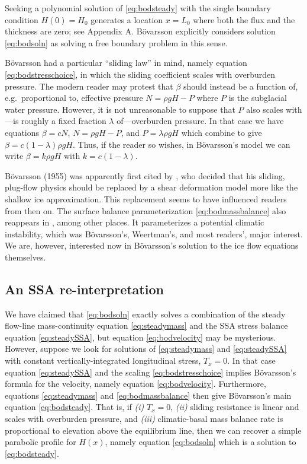 \documentclass[twocolumn,letterpaper]{igs}
\renewcommand{\dh}{\fontencoding{T1}\selectfont{\symbol{240}}}
\newcommand{\bod}{B\"o\dh varsson\xspace}
\newcommand{\citebod}{B\"o\dh varsson (1955)\nocite{Bodvardsson}\xspace}
\begin{document}
Seeking a polynomial solution of \eqref{eq:bodsteady} with the single boundary condition $H(0)=H_0$ generates a location $x=L_0$ where both the flux and the thickness are zero; see Appendix A.  \bod explicitly considers solution \eqref{eq:bodsoln} as solving a free boundary problem in this sense.

\bod had a particular ``sliding law'' in mind, namely equation \eqref{eq:bodstresschoice}, in which the sliding coefficient scales with overburden pressure.  The modern reader may protest that $\beta$ should instead be a function of, e.g.~proportional to, effective pressure $N=\rho g H - P$ where $P$ is the subglacial water pressure.  However, it is not unreasonable to suppose that $P$ also scales with---is roughly a fixed fraction $\lambda$ of---overburden pressure.  In that case we have equations $\beta = c N$, $N=\rho g H - P$, and $P = \lambda \rho g H$ which combine to give $\beta = c (1-\lambda) \rho g H$.  Thus, if the reader so wishes, in \bod's model we can write $\beta = k \rho g H$ with $k=c (1-\lambda)$.

\citebod was apparently first cited by \cite{Weertman61stability}, who decided that his sliding, plug-flow physics should be replaced by a shear deformation model more like the shallow ice approximation.  This replacement seems to have influenced readers from then on.  The surface balance parameterization \eqref{eq:bodmassbalance} also reappears in \cite{Weertman61stability}, among other places.  It parameterizes a potential climatic instability, which was \bod's, Weertman's, and most readers', major interest.  We are, however, interested now in \bod's solution to the ice flow equations themselves.


\subsection*{An SSA re-interpretation}  We have claimed that \eqref{eq:bodsoln} exactly solves a combination of the steady flow-line mass-continuity equation \eqref{eq:steadymass} and the SSA stress balance equation \eqref{eq:steadySSA}, but equation \eqref{eq:bodvelocity} may be mysterious.  However, suppose we look for solutions of \eqref{eq:steadymass} and \eqref{eq:steadySSA} with constant vertically-integrated longitudinal stress, $T_x = 0$.  In that case equation \eqref{eq:steadySSA} and the scaling \eqref{eq:bodstresschoice} implies \bod's formula for the velocity, namely equation \eqref{eq:bodvelocity}.  Furthermore, equations \eqref{eq:steadymass} and \eqref{eq:bodmassbalance} then give \bod's main equation \eqref{eq:bodsteady}.  That is, if \emph{(i)} $T_x = 0$, \emph{(ii)} sliding resistance is linear and scales with overburden pressure, and \emph{(iii)} climatic-basal mass balance rate is proportional to elevation above the equilibrium line, then we can recover a simple parabolic profile for $H(x)$, namely equation \eqref{eq:bodsoln} which is a solution to \eqref{eq:bodsteady}.
\end{document}
